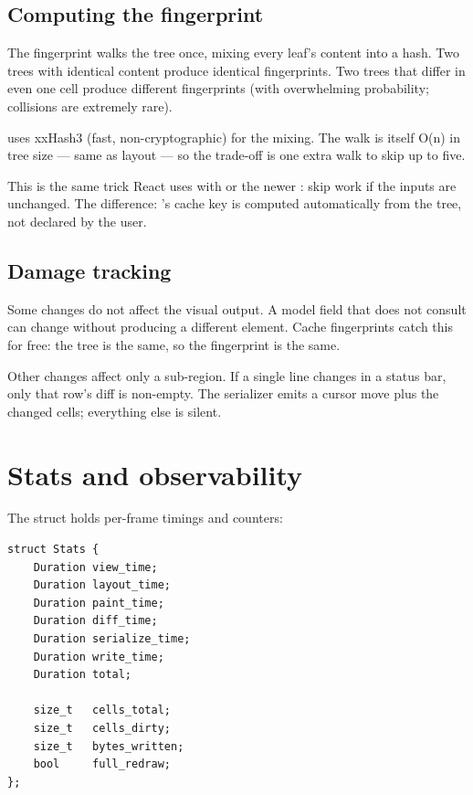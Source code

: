 \subsection*{Computing the fingerprint}

The fingerprint walks the tree once, mixing every leaf's content
into a hash. Two trees with identical content produce identical
fingerprints. Two trees that differ in even one cell produce
different fingerprints (with overwhelming probability; collisions
are extremely rare).

\maya{} uses xxHash3 (fast, non-cryptographic) for the mixing.
The walk is itself O(n) in tree size --- same as layout --- so the
trade-off is one extra walk to skip up to five.

\begin{aside}
This is the same trick React uses with 
or the newer : skip work if the inputs are
unchanged. The difference: \maya{}'s cache key is computed
automatically from the tree, not declared by the user.
\end{aside}

\subsection*{Damage tracking}

Some changes do not affect the visual output. A model field that
 does not consult can change without producing a
different element. Cache fingerprints catch this for free: the
tree is the same, so the fingerprint is the same.

Other changes affect only a sub-region. If a single line changes
in a status bar, only that row's diff is non-empty. The
serializer emits a cursor move plus the changed cells; everything
else is silent.

\section{Stats and observability}

The  struct holds per-frame timings and counters:

\begin{lstlisting}
struct Stats {
    Duration view_time;
    Duration layout_time;
    Duration paint_time;
    Duration diff_time;
    Duration serialize_time;
    Duration write_time;
    Duration total;

    size_t   cells_total;
    size_t   cells_dirty;
    size_t   bytes_written;
    bool     full_redraw;
};
\end{lstlisting}


